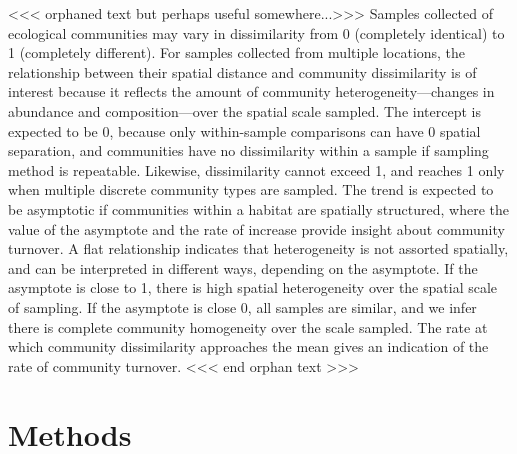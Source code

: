 \documentclass[11pt,letterpaper]{article} %
\begin{document}
<<< orphaned text but perhaps useful somewhere...>>>
Samples collected of ecological communities may vary in dissimilarity from 0 (completely identical) to 1 (completely different).
For samples collected from multiple locations, the relationship between their spatial distance and community dissimilarity is of interest because it reflects the amount of community heterogeneity---changes in abundance and composition---over the spatial scale sampled.
The intercept is expected to be 0, because only within-sample comparisons can have 0 spatial separation, and communities have no dissimilarity within a sample if sampling method is repeatable. %
Likewise, dissimilarity cannot exceed 1, and reaches 1 only when multiple discrete community types are sampled.
The trend is expected to be asymptotic if communities within a habitat are spatially structured, where the value of the asymptote and the rate of increase provide insight about community turnover.
A flat relationship indicates that heterogeneity is not assorted spatially, and can be interpreted in different ways, depending on the asymptote. %
If the asymptote is close to 1, there is high spatial heterogeneity over the spatial scale of sampling.
If the asymptote is close 0, all samples are similar, and we infer there is complete community homogeneity over the scale sampled.
The rate at which community dissimilarity approaches the mean gives an indication of the rate of community turnover.
<<< end orphan text >>>

\section*{Methods}
\end{document}
